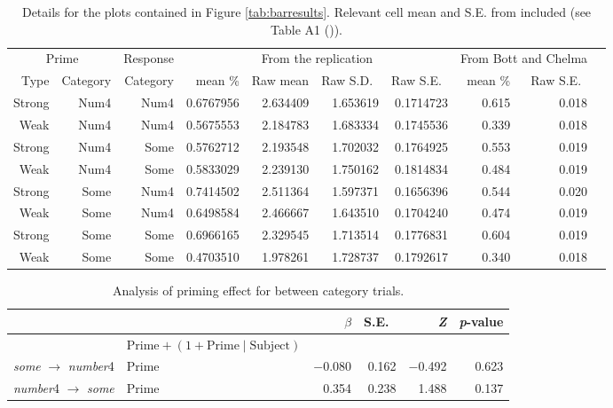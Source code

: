 \documentclass[10pt]{article}
\begin{document}
\begin{table}[h]
  \centering
  \begin{tabular}{rrrrrrrrrr}
    \hline
    \multicolumn{2}{c}{Prime} & Response & \multicolumn{4}{c}{From the replication} & \multicolumn{2}{c}{From Bott and Chelma} \\
    \cline{1-3}
    Type & Category & Category  & mean \% & Raw mean & Raw S.D.\ & Raw S.E.\ &  mean \%  & Raw S.E.\  \\
    \hline
 Strong & Num4 &  Num4 &   0.6767956 &  2.634409 & 1.653619 & 0.1714723  & 0.615 & 0.018   \\
   Weak & Num4 &  Num4 &   0.5675553 &  2.184783 & 1.683334 & 0.1745536  & 0.339 & 0.018    \\
 Strong & Num4 &  Some &   0.5762712 &  2.193548 & 1.702032 & 0.1764925  & 0.553 & 0.019    \\
   Weak & Num4 &  Some &   0.5833029 &  2.239130 & 1.750162 & 0.1814834  & 0.484 & 0.019    \\
 Strong & Some &  Num4 &   0.7414502 &  2.511364 & 1.597371 & 0.1656396  & 0.544 & 0.020    \\
   Weak & Some &  Num4 &   0.6498584 &  2.466667 & 1.643510 & 0.1704240  & 0.474 & 0.019    \\
 Strong & Some &  Some &   0.6966165 &  2.329545 & 1.713514 & 0.1776831  & 0.604 & 0.019    \\
    Weak & Some &  Some &   0.4703510 &  1.978261 & 1.728737 & 0.1792617 & 0.340 & 0.018     \\
    \hline
  \end{tabular}\vspace{-7pt}
  \caption{Details for the plots contained in Figure \ref{tab:barresults}.
  Relevant cell mean and S.E. from \citeauthor{Bott:2016aa} included (see Table A1 (\citeyear[138--139]{Bott:2016aa})).}
\end{table}
\begin{table}[ht]
  \centering
  \begin{tabular}{llrrrr}
    \hline
     & & \(\beta\) & S.E.\ & \emph{Z} & \emph{p}-value  \\
   \hline
    & \(\text{Prime} + (1 + \text{Prime} \mid \text{Subject})\) & & & & \\
    \emph{some} \(\rightarrow\) \emph{number}4 & Prime & \(-\)0.080 &  0.162 & \(-\)0.492 & 0.623 \\
    \emph{number}4 \(\rightarrow\) \emph{some} & Prime & 0.354  &  0.238 & 1.488  & 0.137 \\
    \hline
  \end{tabular}\vspace{-7pt}
  \caption{Analysis of priming effect for between category trials.}
  \label{tab:primebetweeendirection}
\end{table}
\end{document}
